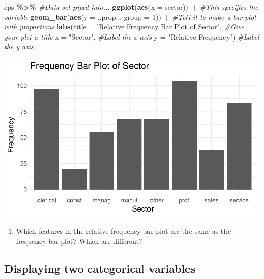 \documentclass[
]{report}
\newenvironment{Shaded}{\begin{snugshade}}{\end{snugshade}}
\newcommand{\CommentTok}[1]{\textcolor[rgb]{0.56,0.35,0.01}{\textit{#1}}}
\newcommand{\DataTypeTok}[1]{\textcolor[rgb]{0.13,0.29,0.53}{#1}}
\newcommand{\DecValTok}[1]{\textcolor[rgb]{0.00,0.00,0.81}{#1}}
\newcommand{\KeywordTok}[1]{\textcolor[rgb]{0.13,0.29,0.53}{\textbf{#1}}}
\newcommand{\NormalTok}[1]{#1}
\newcommand{\OperatorTok}[1]{\textcolor[rgb]{0.81,0.36,0.00}{\textbf{#1}}}
\newcommand{\StringTok}[1]{\textcolor[rgb]{0.31,0.60,0.02}{#1}}
\providecommand{\tightlist}{%
  \setlength{\itemsep}{0pt}\setlength{\parskip}{0pt}}
\begin{document}
\begin{Shaded}
\begin{Highlighting}[]
\NormalTok{cps }\OperatorTok{\%\textgreater{}\%}\StringTok{ }\CommentTok{\#Data set piped into...}
\KeywordTok{ggplot}\NormalTok{(}\KeywordTok{aes}\NormalTok{(}\DataTypeTok{x =}\NormalTok{ sector)) }\OperatorTok{+}\StringTok{   }\CommentTok{\#This specifies the variable}
\StringTok{  }\KeywordTok{geom\_bar}\NormalTok{(}\KeywordTok{aes}\NormalTok{(}\DataTypeTok{y =}\NormalTok{ ..prop.., }\DataTypeTok{group =} \DecValTok{1}\NormalTok{)) }\OperatorTok{+}\StringTok{  }\CommentTok{\#Tell it to make a bar plot with proportions}
\StringTok{  }\KeywordTok{labs}\NormalTok{(}\DataTypeTok{title =} \StringTok{"Relative Frequency Bar Plot of Sector"}\NormalTok{,  }\CommentTok{\#Give your plot a title}
       \DataTypeTok{x =} \StringTok{"Sector"}\NormalTok{,   }\CommentTok{\#Label the x axis}
       \DataTypeTok{y =} \StringTok{"Relative Frequency"}\NormalTok{)  }\CommentTok{\#Label the y axis}
\end{Highlighting}
\end{Shaded}

\begin{center}\includegraphics[width=0.5\linewidth]{03-EDA-categorical_files/figure-latex/unnamed-chunk-3-1} \end{center}

\begin{enumerate}
\def\labelenumi{\arabic{enumi}.}
\setcounter{enumi}{4}
\tightlist
\item
  Which features in the relative frequency bar plot are the same as the frequency bar plot? Which are different?
\end{enumerate}

\vspace{1in}

\hypertarget{displaying-two-categorical-variables}{%
\subsection*{Displaying two categorical variables}\label{displaying-two-categorical-variables}}
\end{document}
